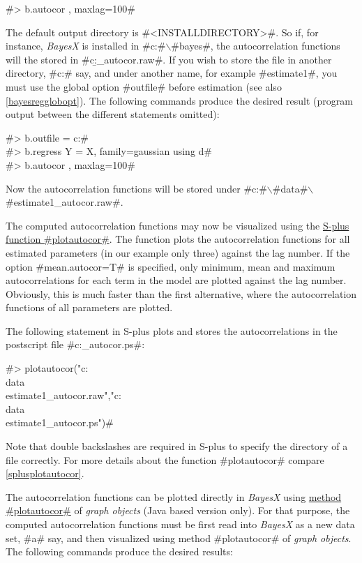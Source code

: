 #> b.autocor , maxlag=100#

The default output directory is #<INSTALLDIRECTORY>\output#. So
if, for instance, {\em BayesX} is installed in
#c:#$\backslash$#bayes#, the autocorrelation functions will the
stored in #c:\bayes\output\b_autocor.raw#. If you wish to store
the file in another directory, #c:\data# say, and under another
name, for example #estimate1#, you must use the global option
#outfile# before estimation (see also \autoref{bayesregglobopt}).
The following commands produce the desired result (program output
between the different statements omitted):

#> b.outfile = c:\data{}# \\
#> b.regress Y = X, family=gaussian using d# \\
#> b.autocor , maxlag=100#

Now the autocorrelation functions will be stored under
#c:#$\backslash$#data#$\backslash$#estimate1_autocor.raw#.

The computed autocorrelation functions may now be visualized using
the \hyperref[splusplotautocor]{S-plus function #plotautocor#}.
The function plots the autocorrelation functions for all estimated
parameters (in our example only three) against the lag number. If
the option #mean.autocor=T# is specified, only minimum, mean and
maximum autocorrelations for each term in the model are plotted
against the lag number. Obviously, this is much faster than the
first alternative, where the autocorrelation functions of all
parameters are plotted.

The following statement in S-plus plots and stores the
autocorrelations in the postscript file
#c:\data{}_autocor.ps#:

 #> plotautocor("c:\\data\\estimate1_autocor.raw","c:\\data\\estimate1_autocor.ps")#

Note that double backslashes are required in S-plus to specify the
directory of a file correctly. For more details about the function
#plotautocor# compare \autoref{splusplotautocor}.

The autocorrelation functions can be plotted directly in {\em
BayesX} using \hyperref[graphplotautocor]{method #plotautocor#} of
{\em graph objects} (Java based version only). For that purpose,
the computed autocorrelation functions must be first read into
{\em BayesX} as a new data set, #a# say, and then visualized using
method #plotautocor# of {\em graph objects}. The following
commands produce the desired results:

